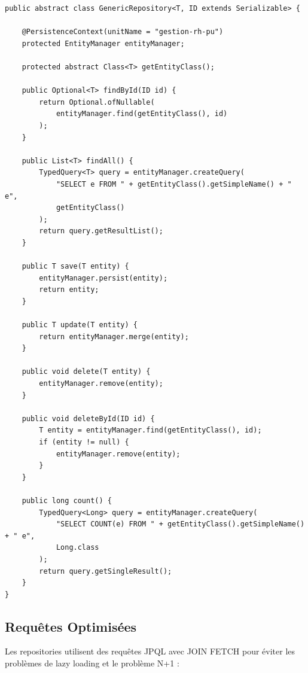 \documentclass[12pt,a4paper,twoside]{report}
\begin{document}
\begin{lstlisting}[caption=Repository générique avec méthodes communes, label=lst:generic-repo]
public abstract class GenericRepository<T, ID extends Serializable> {
    
    @PersistenceContext(unitName = "gestion-rh-pu")
    protected EntityManager entityManager;
    
    protected abstract Class<T> getEntityClass();
    
    public Optional<T> findById(ID id) {
        return Optional.ofNullable(
            entityManager.find(getEntityClass(), id)
        );
    }
    
    public List<T> findAll() {
        TypedQuery<T> query = entityManager.createQuery(
            "SELECT e FROM " + getEntityClass().getSimpleName() + " e",
            getEntityClass()
        );
        return query.getResultList();
    }
    
    public T save(T entity) {
        entityManager.persist(entity);
        return entity;
    }
    
    public T update(T entity) {
        return entityManager.merge(entity);
    }
    
    public void delete(T entity) {
        entityManager.remove(entity);
    }
    
    public void deleteById(ID id) {
        T entity = entityManager.find(getEntityClass(), id);
        if (entity != null) {
            entityManager.remove(entity);
        }
    }
    
    public long count() {
        TypedQuery<Long> query = entityManager.createQuery(
            "SELECT COUNT(e) FROM " + getEntityClass().getSimpleName() + " e",
            Long.class
        );
        return query.getSingleResult();
    }
}
\end{lstlisting}

\subsection{Requêtes Optimisées}

Les repositories utilisent des requêtes JPQL avec JOIN FETCH pour éviter les problèmes de lazy loading et le problème N+1 :
\end{document}
